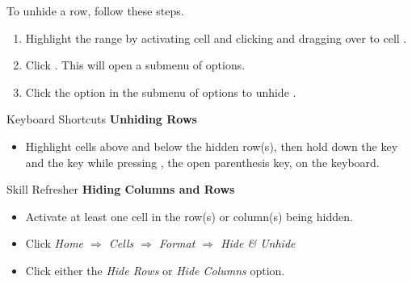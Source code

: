 To unhide a row, follow these steps.

\begin{enumerate}
	\item Highlight the range  by activating cell  and clicking and dragging over to cell .
	\item Click . This will open a submenu of options.
	\item Click the  option in the submenu of options to unhide .
\end{enumerate}

\begin{center}
	\begin{shtcutbox}{Keyboard Shortcuts}
		\textbf{Unhiding Rows}
		\\
		\begin{itemize}
			\setlength{\itemsep}{0pt}
			\setlength{\parskip}{0pt}
			\setlength{\parsep}{0pt}
			
			\item Highlight cells above and below the hidden row(s), then hold down the  key and the  key while pressing \fmtKeystroke{(}, the open parenthesis key, on the keyboard.
			
		\end{itemize}
	\end{shtcutbox}
\end{center}

\begin{center}
	\begin{sklbox}{Skill Refresher}
		\textbf{Hiding Columns and Rows}
		\\
		\begin{itemize}
			\setlength{\itemsep}{0pt}
			\setlength{\parskip}{0pt}
			\setlength{\parsep}{0pt}
			
			\item Activate at least one cell in the row(s) or column(s) being hidden.
			\item Click \textit{Home $ \Rightarrow $ Cells $ \Rightarrow $ Format $ \Rightarrow $ Hide \& Unhide}
			\item Click either the \textit{Hide Rows} or \textit{Hide Columns} option.
			
		\end{itemize}
	\end{sklbox}
\end{center}


